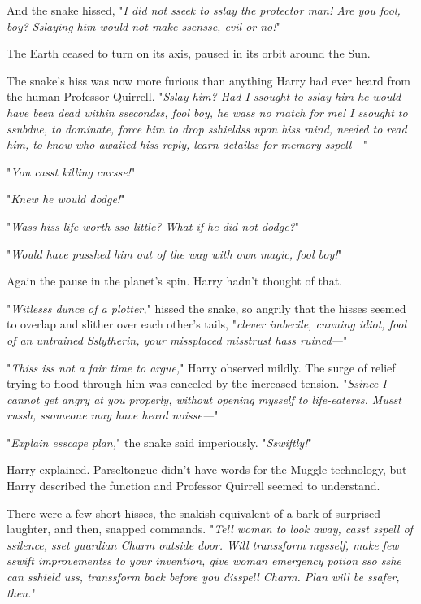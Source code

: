 And the snake hissed, "\emph{I did not sseek to sslay the protector man! Are 
you fool, boy? Sslaying him would not make ssensse, evil or no!}"

The Earth ceased to turn on its axis, paused in its orbit around the Sun.

The snake's hiss was now more furious than anything Harry had ever heard from 
the human Professor Quirrell. "\emph{Sslay him? Had I ssought to sslay him he 
would have been dead within ssecondss, fool boy, he wass no match for me! I 
ssought to ssubdue, to dominate, force him to drop sshieldss upon hiss mind, 
needed to read him, to know who awaited hiss reply, learn detailss for memory 
sspell---}"

"\emph{You casst killing cursse!}"

"\emph{Knew he would dodge!}"

"\emph{Wass hiss life worth sso little? What if he did not dodge?}"

"\emph{Would have pusshed him out of the way with own magic, fool boy!}"

Again the pause in the planet's spin. Harry hadn't thought of that.

"\emph{Witlesss dunce of a plotter,}" hissed the snake, so angrily that the 
hisses seemed to overlap and slither over each other's tails, "\emph{clever 
imbecile, cunning idiot, fool of an untrained Sslytherin, your missplaced 
misstrust hass ruined---}"

"\emph{Thiss iss not a fair time to argue,}" Harry observed mildly. The surge 
of relief trying to flood through him was canceled by the increased tension. 
"\emph{Ssince I cannot get angry at you properly, without opening mysself to 
life-eaterss. Musst russh, ssomeone may have heard noisse---}"

"\emph{Explain esscape plan,}" the snake said imperiously. "\emph{Sswiftly!}"

Harry explained. Parseltongue didn't have words for the Muggle technology, but 
Harry described the function and Professor Quirrell seemed to understand.

There were a few short hisses, the snakish equivalent of a bark of surprised 
laughter, and then, snapped commands. "\emph{Tell woman to look away, casst 
sspell of ssilence, sset guardian Charm outside door. Will transsform mysself, 
make few sswift improvementss to your invention, give woman emergency potion 
sso sshe can sshield uss, transsform back before you disspell Charm. Plan will 
be ssafer, then.}"

